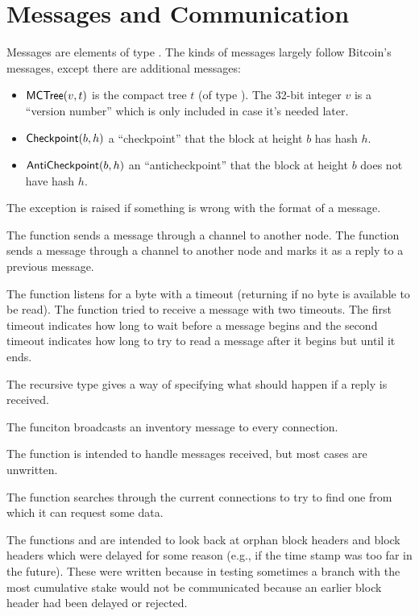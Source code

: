 \section{Messages and Communication}

Messages are elements of type {}.
The kinds of messages largely follow Bitcoin's messages, except there
are additional messages:
\begin{itemize}
\item ${\constr{MCTree}}(v,t)$ is the compact tree $t$ (of type {}).
The 32-bit integer $v$ is a ``version number'' which is only included in case it's needed later.
\item ${\constr{Checkpoint}}(b,h)$ a ``checkpoint'' that the block at height $b$ has hash $h$.
\item ${\constr{AntiCheckpoint}}(b,h)$ an ``anticheckpoint'' that the block at height $b$ does not have hash $h$.
\end{itemize}

The exception {} is raised if something is wrong with the format of a message.

The function {} sends a message through a channel to another node.
The function {} sends a message through a channel to another node
and marks it as a reply to a previous message.

The function {} listens for a byte with a timeout (returning
{} if no byte is available to be read).
The function {} tried to receive a message with two timeouts.
The first timeout indicates how long to wait before a message begins
and the second timeout indicates how long to try to read a message after
it begins but until it ends.

The recursive {} type gives a way of specifying
what should happen if a reply is received.

The funciton {} broadcasts an inventory message to every connection.

The function {} is intended to handle messages received,
but most cases are unwritten.

The function {} searches through the current connections
to try to find one from which it can request some data.

The functions {} and {}
are intended to look back at orphan block headers and block headers which
were delayed for some reason (e.g., if the time stamp was too far in the future).
These were written because in testing sometimes a branch with the most cumulative stake
would not be communicated because an earlier block header had been delayed or rejected.

